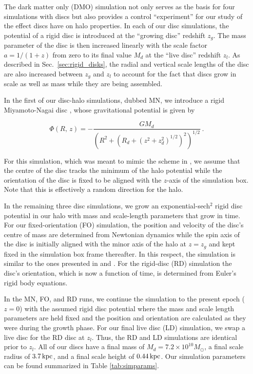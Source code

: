 The dark matter only (DMO) simulation not only serves as the basis for
four simulations with discs but also provides a control ``experiment''
for our study of the effect discs have on halo properties.  In each of
our disc simulations, the potential of a rigid disc is introduced at
the ``growing disc'' redshift $z_g$.  The mass parameter of the disc
is then increased linearly with the scale factor
$a = 1/\left (1+z\right )$ from zero to its final value $M_d$ at the
``live disc'' redshift $z_l$.  As described in
Sec.~\ref{sec:rigid_disks}, the radial and vertical scale lengths of
the disc are also increased between $z_g$ and $z_l$ to account for the
fact that discs grow in scale as well as mass while they are being
assembled.

In the first of our disc-halo simulations, dubbed MN, we introduce a
rigid Miyamoto-Nagai disc \citep{MiyamotoNagai}, whose gravitational
potential is given by

\begin{equation}
  \Phi\left (R,\,z\right ) = -\frac{G M_d} {\left (R^2 + \left(R_d +
    \left(z^2 + z_d^2 \right)^{1/2}\right)^{2}\right )^{1/2}}~.
\end{equation}

\noindent For this simulation, which was meant to mimic the scheme in
\citet{DOhngiaSubstructureDepletion}, we assume that the centre of the
disc tracks the minimum of the halo potential while the orientation of
the disc is fixed to be aligned with the $z$-axis of the simulation
box. Note that this is effectively a random direction for the halo.

In the remaining three disc simulations, we grow an
exponential-sech$^2$ rigid disc potential in our halo with mass and
scale-length parameters that grow in time.  For our fixed-orientation
(FO) simulation, the position and velocity of the disc's centre of
mass are determined from Newtonian dynamics while the spin axis of the
disc is initially aligned with the minor axis of the halo at $z = z_g$
and kept fixed in the simulation box frame thereafter.  In this
respect, the simulation is similar to the ones presented in
\citet{DeBuhrStellarDisks} and \citet{YurinSpringelStellarDisks}.  For
the rigid-disc (RD) simulation the disc's orientation, which is now a
function of time, is determined from Euler's rigid body equations.

In the MN, FO, and RD runs, we continue the simulation to the present
epoch ($z=0$) with the assumed rigid disc potential where the mass and
scale length parameters are held fixed and the position and
orientation are calculated as they were during the growth phase.  For
our final live disc (LD) simulation, we swap a live disc for the RD
disc at $z_l$.  Thus, the RD and LD simulations are identical prior to
$z_l$.  All of our discs have a final mass of
$M_d = 7.2 \times 10^{10} M_\odot$, a final scale radius of
$3.7\,{\rm kpc}$, and a final scale height of $0.44\, {\rm kpc}$. Our simulation
parameters can be found summarized in Table \ref{tab:simparams}.

